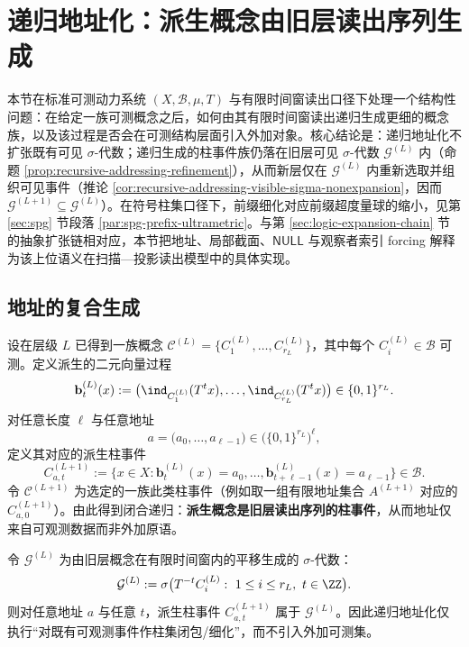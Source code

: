 \section{递归地址化：派生概念由旧层读出序列生成}\label{sec:recursive-addressing}



本节在标准可测动力系统 \((X,\mathcal{B},\mu,T)\) 与有限时间窗读出口径下处理一个结构性问题：在给定一族可测概念之后，如何由其有限时间窗读出递归生成更细的概念族，以及该过程是否会在可测结构层面引入外加对象。核心结论是：递归地址化不扩张既有可见 \(\sigma\)-代数；递归生成的柱事件族仍落在旧层可见 \(\sigma\)-代数 \(\mathcal{G}^{(L)}\) 内（命题 \ref{prop:recursive-addressing-refinement}），从而新层仅在 \(\mathcal{G}^{(L)}\) 内重新选取并组织可见事件（推论 \ref{cor:recursive-addressing-visible-sigma-nonexpansion}，因而 \(\mathcal{G}^{(L+1)}\subseteq \mathcal{G}^{(L)}\)）。在符号柱集口径下，前缀细化对应前缀超度量球的缩小，见第 \ref{sec:spg} 节段落 \ref{par:spg-prefix-ultrametric}。与第 \ref{sec:logic-expansion-chain} 节的抽象扩张链相对应，本节把地址、局部截面、\(\mathsf{NULL}\) 与观察者索引 forcing 解释为该上位语义在扫描—投影读出模型中的具体实现。

\subsection{地址的复合生成}

设在层级 $L$ 已得到一族概念 $\mathcal{C}^{(L)}=\{C^{(L)}_1,\dots,C^{(L)}_{r_L}\}$，其中每个 $C^{(L)}_i\in\mathcal{B}$ 可测。定义派生的二元向量过程
\[
\mathbf{b}^{(L)}_t(x):=\bigl(\ind_{C^{(L)}_1}(T^t x),\dots,\ind_{C^{(L)}_{r_L}}(T^t x)\bigr)\in\{0,1\}^{r_L}.
\]
对任意长度 $\ell$ 与任意地址
\[
a=\bigl(a_0,\dots,a_{\ell-1}\bigr)\in\bigl(\{0,1\}^{r_L}\bigr)^\ell,
\]
定义其对应的派生柱事件
\[
C^{(L+1)}_{a,t}:=\{x\in X:\mathbf{b}^{(L)}_t(x)=a_0,\dots,\mathbf{b}^{(L)}_{t+\ell-1}(x)=a_{\ell-1}\}\in\mathcal{B}.
\]
令 $\mathcal{C}^{(L+1)}$ 为选定的一族此类柱事件（例如取一组有限地址集合 $A^{(L+1)}$ 对应的 $C^{(L+1)}_{a,0}$）。由此得到闭合递归：\textbf{派生概念是旧层读出序列的柱事件}，从而地址仅来自可观测数据而非外加原语。

\begin{proposition}\label{prop:recursive-addressing-refinement}
令 $\mathcal{G}^{(L)}$ 为由旧层概念在有限时间窗内的平移生成的 $\sigma$-代数：
\[
\mathcal{G}^{(L)}:=\sigma\bigl(T^{-t}C_i^{(L)}:\ 1\le i\le r_L,\ t\in\ZZ\bigr).
\]
则对任意地址 $a$ 与任意 $t$，派生柱事件 $C^{(L+1)}_{a,t}$ 属于 $\mathcal{G}^{(L)}$。因此递归地址化仅执行“对既有可观测事件作柱集闭包/细化”，而不引入外加可测集。
\end{proposition}

